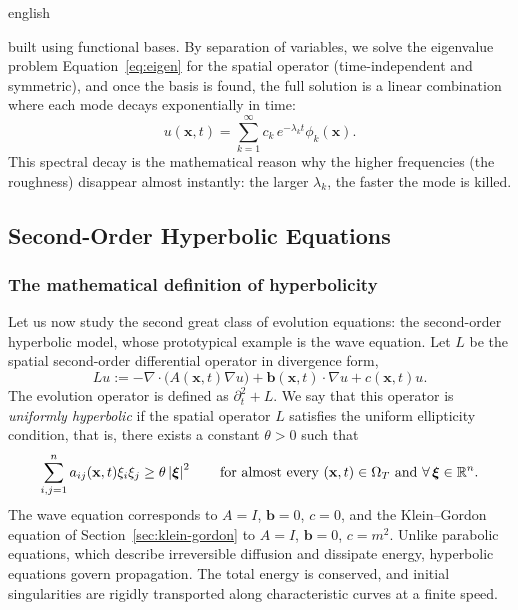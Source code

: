 \begin{hyphenrules}{english}
\begin{enumerate}
    built using functional bases. By separation of variables, we solve the eigenvalue problem
    Equation~\eqref{eq:eigen} for the spatial operator (time-independent and symmetric), and once the basis is
    found, the full solution is a linear combination where each mode decays exponentially in time:
    \begin{equation}
      u(\mathbf{x},t)=\sum_{k=1}^{\infty}c_k\,e^{-\lambda_k t}\phi_k(\mathbf{x}).
      \label{eq:parabolic-modes}
    \end{equation}
    This spectral decay is the mathematical reason why the higher frequencies (the roughness)
    disappear almost instantly: the larger $\lambda_k$, the faster the mode is killed.
\end{enumerate}

\subsection{Second-Order Hyperbolic Equations}\label{subsec:hyperbolic}

\subsubsection{The mathematical definition of hyperbolicity}
Let us now study the second great class of evolution equations: the second-order hyperbolic model,
whose prototypical example is the wave equation. Let $L$ be the spatial second-order differential
operator in divergence form,
\begin{equation}
  Lu:=-\nabla\cdot\big(A(\mathbf{x},t)\nabla u\big)+\mathbf{b}(\mathbf{x},t)\cdot\nabla u+c(\mathbf{x},t)u.
  \label{eq:hyperbolic-op}
\end{equation}
The evolution operator is defined as $\partial_t^2+L$. We say that this operator is \emph{uniformly
hyperbolic} if the spatial operator $L$ satisfies the uniform ellipticity condition, that is, there
exists a constant $\theta>0$ such that
\begin{equation}
  \sum_{i,j=1}^{n}a_{ij}(\mathbf{x},t)\xi_i\xi_j\ge\theta\left\lvert \bm\xi \right\rvert^2\qquad
  \text{for almost every }(\mathbf{x},t)\in\Omega_T\text{ and }\forall\,\bm\xi\in\mathbb{R}^n.
  \label{eq:uniform-hyperbolicity}
\end{equation}
The wave equation corresponds to $A=I$, $\mathbf{b}=0$, $c=0$, and the Klein--Gordon equation of
Section~\ref{sec:klein-gordon} to $A=I$, $\mathbf{b}=0$, $c=m^2$. Unlike parabolic equations, which describe
irreversible diffusion and dissipate energy, hyperbolic equations govern propagation. The total energy is
conserved, and initial singularities are rigidly transported along characteristic curves at a finite
speed.


\end{hyphenrules}
